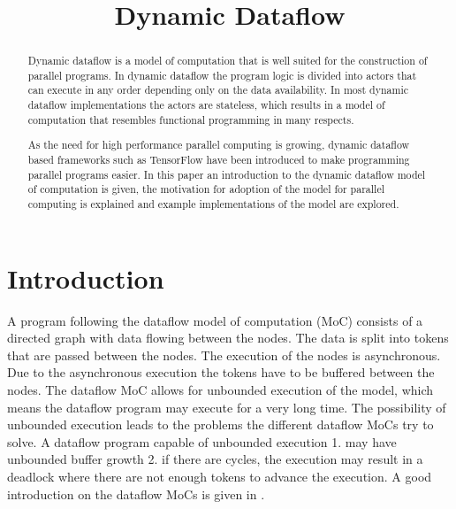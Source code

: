 \documentclass[conference,a4paper]{IEEEtran}
\begin{document}
%
\title{Dynamic Dataflow}

\author{
}

\maketitle

\begin{abstract}
Dynamic dataflow is a model of computation that is well suited for the
construction of parallel programs. In dynamic dataflow the program logic is
divided into actors that can execute in any order depending only on the data
availability. In most dynamic dataflow implementations the actors are stateless,
which results in a model of computation that resembles functional programming in
many respects.

As the need for high performance parallel computing is growing, dynamic dataflow
based frameworks such as TensorFlow have been introduced to make programming
parallel programs easier. In this paper an introduction to the dynamic dataflow
model of computation is given, the motivation for adoption of the model for
parallel computing is explained and example implementations of the model are
explored.
\end{abstract}

\section{Introduction}
A program following the dataflow model of computation (MoC) consists of a
directed graph with data flowing between the nodes. The data is split into
tokens that are passed between the nodes. The execution of the nodes is
asynchronous. Due to the asynchronous execution the tokens have to be buffered
between the nodes. The dataflow MoC allows for unbounded execution of the model,
which means the dataflow program may execute for a very long time. The
possibility of unbounded execution leads to the problems the different dataflow
MoCs try to solve. A dataflow program capable of unbounded execution 1. may have
unbounded buffer growth 2. if there are cycles, the execution may result in a
deadlock where there are not enough tokens to advance the execution. A good
introduction on the dataflow MoCs is given in \cite{lee2015introduction}.
\end{document}
